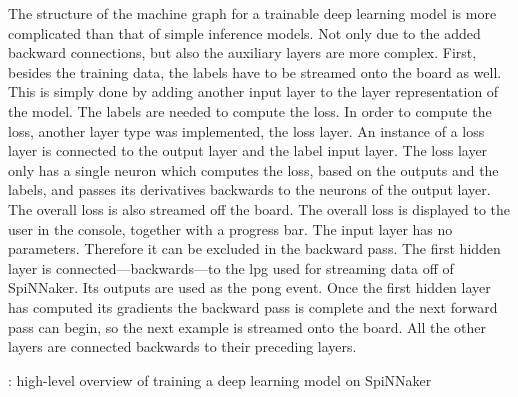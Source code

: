 \documentclass[]{article}
\begin{document}
The structure of the machine graph for a trainable deep learning
model is more complicated than that of simple inference models.
Not only due to the added backward connections, but also the
auxiliary layers are more complex.
First, besides the training data, the labels have to be streamed onto
the board as well.
This is simply done by adding another input layer to the layer
representation of the model.
The labels are needed to compute the loss.
In order to compute the loss, another layer type was implemented,
the loss layer.
An instance of a loss layer is connected to the output layer and the
label input layer.
The loss layer only has a single neuron which computes the loss,
based on the outputs and the labels, and passes its derivatives
backwards to the neurons of the output layer.
The overall loss is also streamed off the board.
The overall loss is displayed to the user in the console, together
with a progress bar.
The input layer has no parameters.
Therefore it can be excluded in the backward pass.
The first hidden layer is connected---backwards---to the \acrshort{lpg} used
for streaming data off of SpiNNaker.
Its outputs are used as the pong event.
Once the first hidden layer has computed its gradients the backward
pass is complete and the next forward pass can begin, so the next
example is streamed onto the board.
All the other layers are connected backwards to their preceding
layers.

\begin{algorithm} %
  \caption{: high-level overview of training a deep learning model on
    SpiNNaker}
  \label{alg:backprop}

  \begin{algorithmic}[1]
        \ENDIF
        \ENDIF
      \ENDFOR
    \ENDFOR
  \end{algorithmic}
\end{algorithm} %
\end{document}
